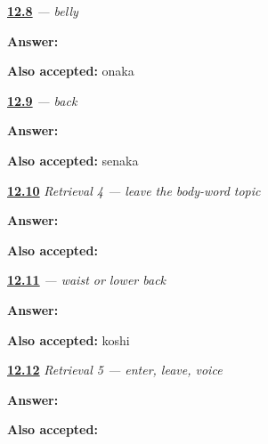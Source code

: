\noindent\begin{minipage}[t]{\linewidth}
\raggedright
\hyperlink{review-JA-C12-onaka-write}{\textbf{12.8}} \emph{ — belly}\par
\small \textbf{Answer:} \par
\footnotesize \textbf{Also accepted:} onaka
\end{minipage}\par\medskip

\noindent\begin{minipage}[t]{\linewidth}
\raggedright
\hyperlink{review-JA-C12-senaka-write}{\textbf{12.9}} \emph{ — back}\par
\small \textbf{Answer:} \par
\footnotesize \textbf{Also accepted:} senaka
\end{minipage}\par\medskip

\noindent\begin{minipage}[t]{\linewidth}
\raggedright
\hyperlink{review-JA-R12-doorway-card}{\textbf{12.10}} \emph{Retrieval 4 — leave the body-word topic}\par
\small \textbf{Answer:} \par
\footnotesize \textbf{Also accepted:}     
\end{minipage}\par\medskip

\noindent\begin{minipage}[t]{\linewidth}
\raggedright
\hyperlink{review-JA-C12-koshi-write}{\textbf{12.11}} \emph{ — waist or lower back}\par
\small \textbf{Answer:} \par
\footnotesize \textbf{Also accepted:} koshi
\end{minipage}\par\medskip

\noindent\begin{minipage}[t]{\linewidth}
\raggedright
\hyperlink{review-JA-R12-farewell-card}{\textbf{12.12}} \emph{Retrieval 5 — enter, leave, voice}\par
\small \textbf{Answer:} \par
\footnotesize \textbf{Also accepted:}    
\end{minipage}\par\medskip

